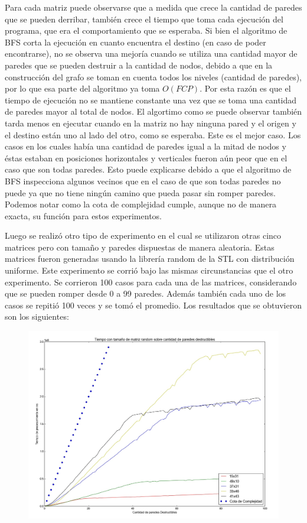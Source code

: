   Para cada matriz puede observarse que a medida que crece la cantidad de paredes que se pueden derribar, también crece el tiempo que toma cada ejecución del programa, que era el comportamiento que se esperaba. Si bien el algoritmo de BFS corta la ejecución en cuanto encuentra el destino (en caso de poder encontrarse), no se observa una mejoría cuando se utiliza una cantidad mayor de paredes que se pueden destruir a la cantidad de nodos, debido a que en la construcción del grafo se toman en cuenta todos los niveles (cantidad de paredes), por lo que esa parte del algoritmo ya toma $O(FCP)$. Por esta razón es que el tiempo de ejecución no se mantiene constante una vez que se toma una cantidad de paredes mayor al total de nodos. El algortimo como se puede observar también tarda menos en ejecutar cuando en la matriz no hay ninguna pared y el origen y el destino están uno al lado del otro, como se esperaba. Este es el mejor caso. Los casos en los cuales había una cantidad de paredes igual a la mitad de nodos y éstas estaban en posiciones horizontales y verticales fueron aún peor que en el caso que son todas paredes. Esto puede explicarse debido a que el algoritmo de BFS inspecciona algunos vecinos que en el caso de que son todas paredes no puede ya que no tiene ningún camino que pueda pasar sin romper paredes.
  Podemos notar como la cota de complejidad cumple, aunque no de manera exacta, su función para estos experimentos.


  Luego se realizó otro tipo de experimento en el cual se utilizaron otras cinco matrices pero con tamaño y paredes dispuestas de manera aleatoria. Estas matrices fueron generadas usando la librería random de la STL con distribución uniforme. Este experimento se corrió bajo las mismas circunstancias que el otro experimento. Se corrieron 100 casos para cada una de las matrices, considerando que se pueden romper desde 0 a 99 paredes. Además también cada uno de los casos se repitió 100 veces y se tomó el promedio. Los resultados que se obtuvieron son los siguientes:

  \begin{figure}[H]
      \begin{center}
        \includegraphics[width=0.7\columnwidth]{../exp/ej1tamanosRandom.jpeg}
        \caption{}
      \end{center}
  \end{figure}

